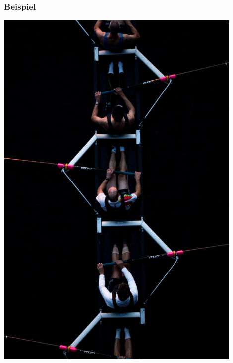 \documentclass{beamer}
\begin{document}
\begin{frame}
\end{frame}
 
\begin{frame}
\frametitle{Beispiel}

\begin{center}
\includegraphics[width=0.9\textwidth]{rowing.jpg}
\end{center}

\end{frame}
 
\end{document}
